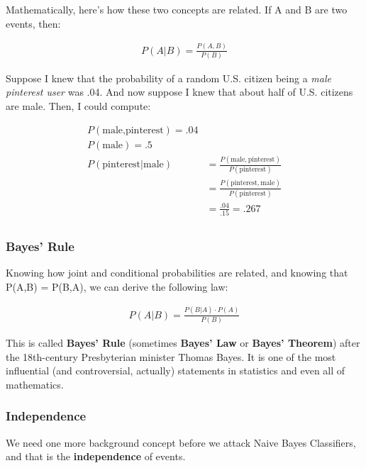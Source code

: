\documentclass[12pt]{article}
\begin{document}
Mathematically, here's how these two concepts are related. If A and B are two
events, then:

\vspace{-.2in}
\begin{align*}
P(A|B) = \frac{P(A,B)}{P(B)}
\end{align*}

Suppose I knew that the probability of a random U.S. citizen being a
\textit{male pinterest user} was .04. And now suppose I knew that about half
of U.S. citizens are male. Then, I could compute:

\vspace{-.2in}
\begin{align*}
P(\textrm{male,pinterest}) = .04 \\
P(\textrm{male}) = .5 \\
P(\textrm{pinterest} | \textrm{male}) &= \frac{P(\textrm{male},
\textrm{pinterest})}{P(\textrm{pinterest})} \\
                    &= \frac{P(\textrm{pinterest},
\textrm{male})}{P(\textrm{pinterest})} \\
                    &= \frac{.04}{.15} = .267 \\
\end{align*}

\subsubsection{Bayes' Rule}

Knowing how joint and conditional probabilities are related, and knowing that
P(A,B) = P(B,A), we can derive the following law:

\vspace{-.2in}
\begin{align*}
P(A|B) = \frac{P(B|A) \cdot P(A)}{P(B)}
\end{align*}

This is called \textbf{Bayes' Rule} (sometimes \textbf{Bayes' Law} or
\textbf{Bayes' Theorem}) after the 18th-century Presbyterian minister Thomas
Bayes. It is one of the most influential (and controversial, actually)
statements in statistics and even all of mathematics.

\subsubsection{Independence}

We need one more background concept before we attack Naive Bayes Classifiers,
and that is the \textbf{independence} of events.
\end{document}
